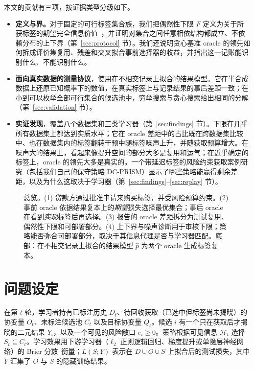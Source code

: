 \documentclass[runningheads]{llncs}
\begin{document}
本文的贡献有三项，按证据类型分级如下。
\begin{itemize}
\item \textbf{定义与界。}对于固定的可行标签集合族，我们把偶然性下限 $F$ 定义为关于所获标签的期望完全信息价值~\cite{howard1966information}，并证明对集合之间任意相依结构都成立、不依赖分布的上下界（第~\ref{sec:protocol} 节）。我们还说明贪心基准 oracle 的领先如何拆成评价集复用、残差和交叉拟合事前选择器的收益，并指出这一记账能识别什么、不能识别什么。
\item \textbf{面向真实数据的测量协议}，使用在不相交记录上拟合的结果模型。它在半合成数据上还原已知概率下的数值，在真实标签上与记录结果的事后差距一致；在小到可以枚举全部可行集合的候选池中，穷举搜索与贪心搜索给出相同的分解（第~\ref{sec:validation} 节）。
\item \textbf{实证发现}，覆盖八个数据集和三类学习器（第~\ref{sec:findings} 节）。下限在几乎所有数据集上都达到实质水平；它在 oracle 差距中的占比既在跨数据集比较中、也在数据集内的标签翻转干预中随标签噪声上升，并随获取预算增大。在噪声大的结果上，看起来像提升空间的部分大多是复用和运气；在近乎确定的标签上，oracle 的领先大多是真实的。一个带延迟标签的风险约束获取案例研究（包括我们自己的保守策略 DC-PRISM）显示了哪些策略能赢得剩余差距，以及为什么这取决于学习器（第~\ref{sec:findings}--\ref{sec:replay} 节）。
\end{itemize}

\begin{figure}[t]
 \centering
 \resizebox{\linewidth}{!}{}
 \caption{总览。(1) 贷款方通过批准申请来购买标签，并受风险预算约束。(2) 事前 oracle 依据结果复本上的\emph{期望}损失选择最优集合；事后 oracle 在看到\emph{实现}标签后再选择。(3) 报告的 oracle 差距拆分为测试复用、偶然性下限和可部署部分。(4) 上下界与噪声诊断用于审核下限；策略能否弥合可部署部分，取决于其信息代理是否与学习器匹配。底部：在不相交记录上拟合的结果模型 $\hat p$ 为两个 oracle 生成标签复本。}
 \label{fig:framework}
\end{figure}

\section{问题设定}
\label{sec:setting}
在第 $t$ 轮，学习者持有已标注历史 $D_t$、待回收获取（已选中但标签尚未揭晓）的协变量 $O_t$、未标注候选池 $C_t$ 以及目标协变量 $Q_t$。候选 $i$ 有一个只在获取后才揭晓的二元结果 $Y_i$，以及一个可见的风险敞口 $e_i\ge0$。策略根据可见信息 $\mathcal H_t$ 选择 $S_t\subseteq C_t$。学习效果用下游学习器（$\ell_2$ 正则逻辑回归、梯度提升或单隐层神经网络）的 Brier 分数~\cite{brier1950verification}衡量；$L(S;Y)$ 表示在 $D\cup O\cup S$ 上拟合后的测试损失，其中 $Y$ 汇集了 $O$ 与 $S$ 的隐藏训练结果。
\end{document}
